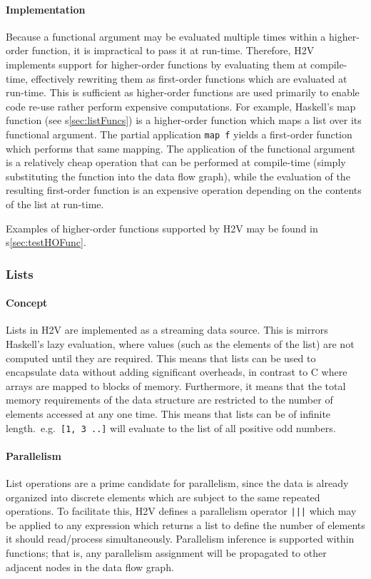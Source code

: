 \documentclass[english,onecolumn]{scrartcl}
\begin{document}
\paragraph{Implementation}
Because a functional argument may be evaluated multiple times within a higher-order function, it is impractical to pass it at
run-time. Therefore, H2V implements support for higher-order functions by evaluating them at compile-time, effectively rewriting
them as first-order functions which are evaluated at run-time. This is sufficient as higher-order functions are used primarily to
enable code re-use rather perform expensive computations. For example, Haskell's map function (see s\ref{sec:listFuncs}) is a
higher-order function which maps a list over its functional argument. The partial application \texttt{map f} yields a first-order
function which performs that same mapping. The application of the functional argument is a relatively cheap operation that can be
performed at compile-time (simply substituting the function into the data flow graph), while the evaluation of the resulting
first-order function is an expensive operation depending on the contents of the list at run-time.

Examples of higher-order functions supported by H2V may be found in s\ref{sec:testHOFunc}.

\subsubsection{Lists}
\paragraph{Concept}
Lists in H2V are implemented as a streaming data source. This is mirrors Haskell's lazy evaluation, where values (such as the
elements of the list) are not computed until they are required. This means that lists can be used to encapsulate data without
adding significant overheads, in contrast to C where arrays are mapped to blocks of memory. Furthermore, it means that the total
memory requirements of the data structure are restricted to the number of elements accessed at any one time. This means that lists
can be of infinite length.\ e.g.\ \texttt{[1, 3 ..]} will evaluate to the list of all positive odd numbers.

\paragraph{Parallelism}
\label{sec:listPar}
List operations are a prime candidate for parallelism, since the data is already organized into discrete elements which are
subject to the same repeated operations. To facilitate this, H2V defines a parallelism operator \texttt{|||} which may be applied
to any expression which returns a list to define the number of elements it should read/process simultaneously. Parallelism
inference is supported within functions; that is, any parallelism assignment will be propagated to other adjacent nodes in the
data flow graph.
\end{document}
